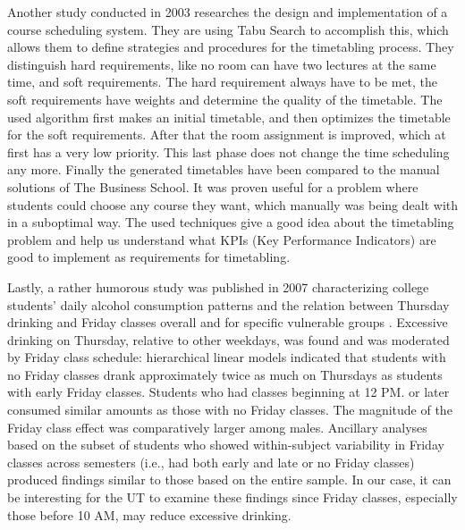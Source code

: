 Another study conducted in 2003 \cite{designAndImplementationOfACourseSchedulingSystem} researches the design and implementation of a course scheduling system. They are using Tabu Search to accomplish this, which allows them to define strategies and procedures for the timetabling process. They distinguish hard requirements, like no room can have two lectures at the same time, and soft requirements. The hard requirement always have to be met, the soft requirements have weights and determine the quality of the timetable. The used algorithm first makes an initial timetable, and then optimizes the timetable for the soft requirements. After that the room assignment is improved, which at first has a very low priority. This last phase does not change the time scheduling any more. Finally the generated timetables have been compared to the manual solutions of The Business School. It was proven useful for a problem where students could choose any course they want, which manually was being dealt with in a suboptimal way. The used techniques give a good idea about the timetabling problem and help us understand what KPIs (Key Performance Indicators) are good to implement as requirements for timetabling.

Lastly, a rather humorous study was published in 2007 characterizing college students’ daily alcohol consumption patterns and the relation between Thursday drinking and Friday classes overall and for specific vulnerable groups \cite{collegeStudentAlcoholConsumption}. Excessive drinking on Thursday, relative to other weekdays, was found and was moderated by Friday class schedule: hierarchical linear models indicated that students with no Friday classes drank approximately twice as much on Thursdays as students with early Friday classes. Students who had classes beginning at 12 PM. or later consumed similar amounts as those with no Friday classes. The magnitude of the Friday class effect was comparatively larger among males. Ancillary analyses based on the subset of students who showed within-subject variability in Friday classes across semesters (i.e., had both early and late or no Friday classes) produced findings similar to those based on the entire sample. In our case, it can be interesting for the UT to examine these findings since Friday classes, especially those before 10 AM, may reduce excessive drinking.
